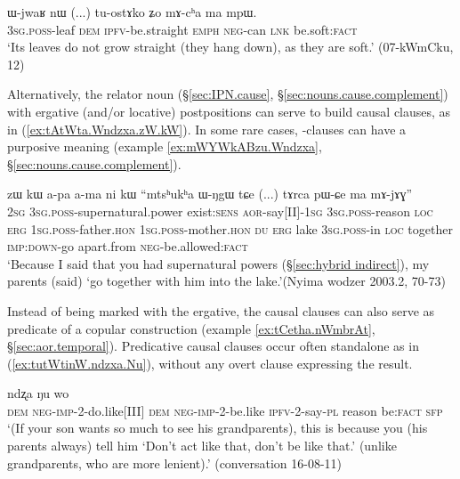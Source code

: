 \begin{exe}
\ex \label{ex:mAcha.ma.mpW}
\gll ɯ-jwaʁ nɯ (...) tu-ostɤko ʑo mɤ-cʰa ma mpɯ. \\
\textsc{3sg}.\textsc{poss}-leaf \textsc{dem} { } \textsc{ipfv}-be.straight \textsc{emph} \textsc{neg}-can \textsc{lnk} be.soft:\textsc{fact} \\
\glt `Its leaves do not grow straight (they hang down), as they are soft.' (07-kWmCku, 12)
\end{exe}

Alternatively, the relator noun  (§\ref{sec:IPN.cause}, §\ref{sec:nouns.cause.complement}) with ergative (and/or locative) postpositions can serve to build causal clauses, as in (\ref{ex:tAtWta.Wndzxa.zW.kW}). In some rare cases, -clauses can have a purposive meaning (example \ref{ex:mWYWkABzu.Wndzxa}, §\ref{sec:nouns.cause.complement}).

\begin{exe}
\ex \label{ex:tAtWta.Wndzxa.zW.kW}
 zɯ kɯ a-pa a-ma ni kɯ ``mtsʰukʰa ɯ-ŋgɯ tɕe (...) tɤrca pɯ-ɕe ma mɤ-jɤɣ'' \\
\textsc{2sg} \textsc{3sg}.\textsc{poss}-supernatural.power exist:\textsc{sens} \textsc{aor}-say[II]-\textsc{1sg} \textsc{3sg}.\textsc{poss}-reason \textsc{loc} \textsc{erg} \textsc{1sg}.\textsc{poss}-father.\textsc{hon} \textsc{1sg}.\textsc{poss}-mother.\textsc{hon} \textsc{du} \textsc{erg} lake \textsc{3sg}.\textsc{poss}-in \textsc{loc} {  } together \textsc{imp}:\textsc{down}-go apart.from \textsc{neg}-be.allowed:\textsc{fact} \\
\glt `Because I said that you had supernatural powers (§\ref{sec:hybrid indirect}), my parents (said) `go together with him into the lake.'(Nyima wodzer 2003.2, 70-73)
\end{exe}

Instead of being marked with the ergative, the causal clauses can also serve as predicate of a copular construction (example \ref{ex:tCetha.nWmbrAt}, §\ref{sec:aor.temporal}). Predicative causal clauses occur often standalone as in (\ref{ex:tutWtinW.ndzxa.Nu}), without any overt clause expressing the result.


\begin{exe}
\ex \label{ex:tutWtinW.ndzxa.Nu}
 ndʐa ŋu wo \\
\textsc{dem} \textsc{neg}-\textsc{imp}-2-do.like[III] \textsc{dem}  \textsc{neg}-\textsc{imp}-2-be.like \textsc{ipfv}-2-say-\textsc{pl} reason be:\textsc{fact} \textsc{sfp} \\
\glt `(If your son wants so much to see his grandparents), this is because you (his parents always)  tell him `Don't act like that, don't be like that.' (unlike grandparents, who are more lenient).' (conversation 16-08-11)
\end{exe}

